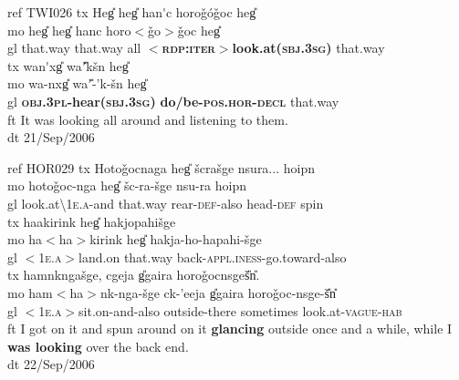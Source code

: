 \ea\label{bouda:ex:TWI026}
ref TWI026
\glll 
tx Heg{\U} heg{\U} han\'{\A}{\A}c horo\v{g}\'o\v{g}oc heg{\U}          \\
mo heg{\U} heg{\U} han{\A}{\A}c     horo$<$\v{g}o$>$\v{g}oc heg{\U}         \\
gl that.way that.way all \textbf{$<$\textsc{rdp}:\textsc{iter}$>$look.at(\textsc{sbj}.\textsc{3sg})} that.way     \\
\glll
tx wan\'{\A}xg{\U} wa'{\U}{\A}k\v{s}{\A}n{\A} heg{\U} {} \\ 
mo wa-n{\A}{\A}xg{\U} wa'{\U}-'{\A}k-\v{s}{\A}n{\A} heg{\U} \\
gl \textbf{\textsc{obj}.\textsc{3pl}-hear(\textsc{sbj}.\textsc{3sg})} \textbf{do/be-\textsc{pos}.\textsc{hor}-\textsc{decl}} that.way\\

ft It was looking all around and listening to them.\\
dt 21/Sep/2006\\
\z
 
\ea\label{bouda:ex:HOR029}
ref HOR029
\glll 
tx Hoto\v{g}ocnaga heg{\U} \v{s}{\II}{\II}cra\v{s}ge n{\A}{\A}sura...     hoip{\II}n{\II} \\
mo hoto\v{g}oc-n{\A}ga heg{\U} \v{s}{\II}{\II}c-ra-\v{s}ge n{\A}{\A}su-ra hoip{\II}n{\II}   \\
gl look.at{\textbackslash}\textsc{1e.a}-and that.way rear-\textsc{def}-also head-\textsc{def}        spin                \\
\glll
tx haakirin{\A}k heg{\U}        hakjopahi\v{s}ge              \\
mo ha$<$ha$>$kirin{\A}k heg{\U} hakja-ho-hapahi-\v{s}ge         \\
gl $<$1\textsc{e.a}$>$land.on that.way   back-\textsc{appl}.\textsc{iness}-go.toward-also    \\
\glll
tx ham{\II}{\A}n{\A}kn{\A}ga\v{s}ge, c{\A}{\A}geja g{\U}{\A}gaira horo\v{g}ocn{\II}{\II}sge\v{s}{\U}n{\U}.\\
mo ham{\II}$<$ha$>$n{\A}k-n{\A}ga-\v{s}ge c{\A}{\A}k-'eeja g{\U}{\A}gaira horo\v{g}oc-n{\II}{\II}sge-\v{s}{\U}n{\U} \\
gl  $<$1\textsc{e.a}$>$sit.on-and-also outside-there sometimes look.at-\textsc{vague}-\textsc{hab}\\

ft I got on it and spun around on it \textbf{glancing} outside once and a while, while I \textbf{was looking} over the back end.\\
dt 22/Sep/2006\\
\z



